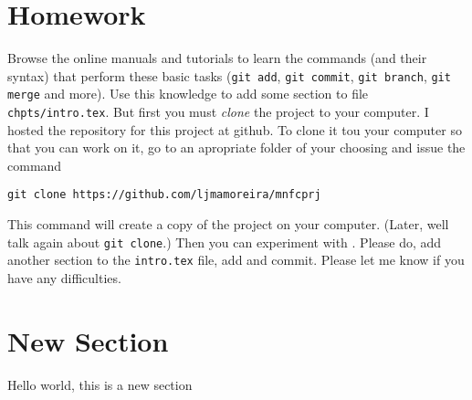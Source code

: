\section{Homework}
Browse the online \git{} manuals and tutorials to learn the commands (and their
syntax) that perform these basic tasks (\texttt{git add}, \texttt{git commit},
\texttt{git branch}, \texttt{git merge} and more). Use this knowledge to add
some section to file \texttt{chpts/intro.tex}. But first you must \emph{clone}
the project to your computer. I hosted the repository for this project at
github. To clone it tou your computer so that you can work on it, go to an
apropriate folder of your choosing and issue the command

\texttt{git clone https://github.com/ljmamoreira/mnfcprj}

This command will create a copy of the project on your computer. (Later, well
talk again about \texttt{git clone}.) Then you can
experiment with \git. Please do, add another section to the \texttt{intro.tex}
file, add and commit. Please let me know if you have any difficulties.

\section{New Section}

Hello world, this is a new section
